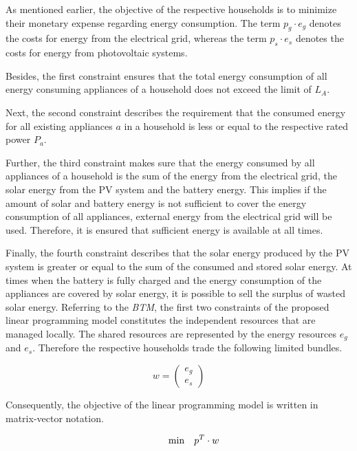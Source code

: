 As mentioned earlier,
the objective of the respective households is to minimize
their monetary expense regarding energy consumption.
The term $p_{g} \cdot e_{g}$ denotes the costs for energy from the electrical
grid, whereas the term $p_{s} \cdot e_{s}$ denotes the costs for energy from photovoltaic systems. 

Besides, the first constraint ensures that the total energy consumption of all energy consuming
appliances of a household does not exceed the limit of $L_{A}$. 

Next, the second constraint describes the requirement that the consumed energy
for all existing appliances $a$ in a household is less or equal 
to the respective rated power $P_{a}$.

Further, the third constraint makes sure that the energy consumed by all appliances
of a household is the sum of the energy from the electrical grid, the solar energy from the PV system and the battery energy. This implies if the amount of solar and battery energy is not sufficient to cover the energy consumption of all appliances, external energy from the electrical grid will be used. Therefore, it is ensured that sufficient energy is available at all times.

Finally, the fourth constraint describes that the solar energy produced by the PV system is greater or equal to the sum of the consumed and stored solar energy. 
At times when the battery is fully charged and the energy consumption of the 
appliances are covered by solar energy, it is possible to sell the surplus of 
wasted solar energy.
Referring to the \textit{BTM}, the first two constraints of the proposed linear
programming model constitutes the independent resources that are managed locally.
The shared resources are represented by 
the energy resources $e_{g}$ and $e_{s}$.
Therefore the respective households trade the following limited bundles.

\[
w=
  \begin{pmatrix}
e_{g} \\
e_{s}
  \end{pmatrix}
\]

Consequently, the objective of the linear programming 
model is written in matrix-vector notation.

\begin{equation*}
 \begin{array}{ll@{}ll}
        \text{min} & \displaystyle p^{T} \cdot w
 \end{array}
\end{equation*}

